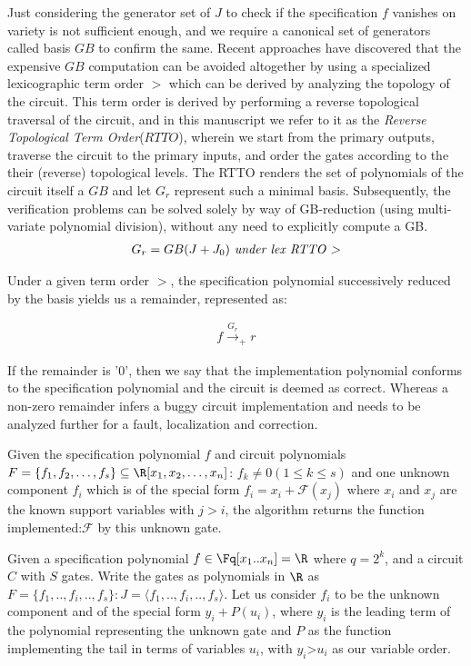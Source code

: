 Just considering the generator set of $J$ to check if the specification $f$ vanishes on variety is not sufficient enough, and we require a canonical set of generators called \Grobner basis $GB$ to confirm the same. Recent approaches have discovered that the expensive $GB$ computation can be avoided altogether by using a specialized lexicographic term order $>$ which can be derived by analyzing the topology of the circuit. This term order\cite{lv} is derived by performing a reverse topological traversal of the circuit, and in this manuscript we refer to it as the {\it Reverse Topological Term Order}($RTTO$), wherein we start from the primary outputs, traverse the circuit to the primary inputs, and order the gates according to the their (reverse) topological levels. The RTTO renders the set of polynomials of the circuit itself a $GB$ and let $G_r$ represent such a minimal basis. Subsequently, the verification problems can be solved solely by way of GB-reduction (using multi-variate polynomial division), without any need to explicitly compute a GB.
\begin{gather*}
G_r = GB(J+J_0) \textit{ under lex RTTO \textgreater} \\
\end{gather*}

Under a given term order $>$, the specification polynomial successively reduced by the basis yields us a remainder, represented as:

\begin{gather*}
f \overset{G_r}{\longrightarrow}_+ r
\end{gather*}

If the remainder is '0', then we say that the implementation polynomial conforms to the specification polynomial and the circuit is deemed as correct. Whereas a non-zero remainder infers a buggy circuit implementation and needs to be analyzed further for a fault, localization and correction.

Given the specification polynomial $f$ and circuit polynomials $F=\{f_1,f_2, \dots, f_s\}\subseteq \R[x_1,x_2, \dots, x_n]$: $f_k\neq 0(1\leq k \leq s)$ and one unknown component $f_i$ which is of the special form $f_i = x_i + \mathcal{F}(x_j)$ where $x_i$ and $x_j$ are the known support variables with $j > i$, the algorithm returns the function implemented:$\mathcal{F}$ by this unknown gate.

Given a specification polynomial $f \in \Fq[x_1..x_n]=\R$ where $q=2^k$, and a circuit $C$ with $S$ gates. Write the gates as polynomials in $\R$ as $F=\{f_1,..,f_i,..,f_s\}: J=\langle f_1,..,f_i,..,f_s\rangle$. Let us consider $f_i$ to be the unknown component and of the special form $y_i+P(u_i)$, where $y_i$ is the leading term of the polynomial representing the unknown gate and $P$ as the function implementing the tail in terms of variables $u_i$, with $y_i$\textgreater $u_i$ as our variable order.

